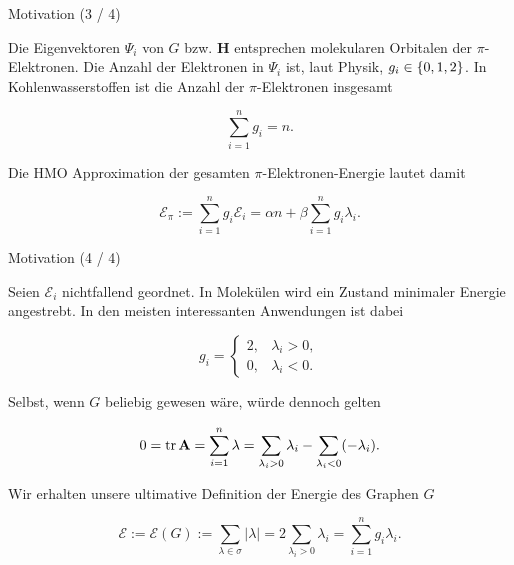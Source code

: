 \documentclass[aspectratio = 169]{beamer}
\begin{document}

\begin{frame}{Motivation (3 / 4)}

    \begin{block}{}

        Die Eigenvektoren $\Psi_i$ von $G$ bzw. $\mathbf H$ entsprechen molekularen Orbitalen der $\pi$-Elektronen.
        Die Anzahl der Elektronen in $\Psi_i$ ist, laut Physik, $g_i \in {\left \{ 0, 1, 2 \right \}}$.
        In Kohlenwasserstoffen ist die Anzahl der $\pi$-Elektronen insgesamt

        \[
            \sum_{i=1}^n g_i = n.
        \]

        Die HMO Approximation der gesamten $\pi$-Elektronen-Energie lautet damit

        \[
            \mathcal E_\pi
            :=
            \sum_{i=1}^n g_i \mathcal E_i
            =
            \alpha n + \beta \sum_{i=1}^n g_i \lambda_i.
        \]

    \end{block}

\end{frame}


\begin{frame}{Motivation (4 / 4)}

    \begin{block}{}

        Seien $\mathcal E_i$ nichtfallend geordnet.
        In Molekülen wird ein Zustand minimaler Energie angestrebt.
        In den meisten interessanten Anwendungen ist dabei

        \[
            g_i
            =
            \begin{cases}
                2, & \lambda_i > 0, \\
                0, & \lambda_i < 0.
            \end{cases}
        \]

        Selbst, wenn $G$ beliebig gewesen wäre, würde dennoch gelten

        \[
            0
            =
            \operatorname{tr} \mathbf A
            =
            \sum_{i=1}^n \lambda
            =
            \sum_{\lambda_i > 0} \lambda_i
            -
            \sum_{\lambda_i < 0} (-\lambda_i).
        \]

        Wir erhalten unsere ultimative Definition der Energie des Graphen $G$

        \[
            \mathcal E
            :=
            \mathcal E(G)
            :=
            \sum_{\lambda \in \sigma} |\lambda|
            =
            2 \sum_{\lambda_i > 0} \lambda_i
            =
            \sum_{i=1}^n g_i \lambda_i.
        \]

    \end{block}

\end{frame}
\end{document}

